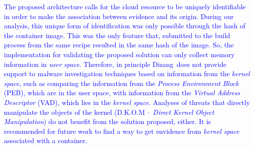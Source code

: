 \documentclass[conference]{IEEEtran}
\newcommand{\fancyname}{Dizang}
\begin{document}
\textcolor{blue}{The proposed architecture calls for the cloud resource to be uniquely identifiable in order to make the association between evidence and its origin.
%
During our analysis, this unique form of identification was only possible through the hash of the container image. 
%
This was the only feature that, submitted to the build process from the same recipe resulted in the same hash of the image.
%
So, the implementation for validating the proposed solution can only collect memory information in \textit{user space}.
%
Therefore, in principle \fancyname\ does not provide support to malware investigation techniques based on information from the \textit{kernel space}, such as comparing the information from the \textit{Process Environment Block} (PEB), which are in the user space, with information from the \textit{Virtual Address Descriptor} (VAD), which lies in the \textit{kernel space}. 
%
Analyses of threats that directly manipulate the objects of the kernel (D.K.O.M – \textit{Direct Kernel Object Manipulation}) do not benefit from the solution proposed, either.
%
It is recommended for future work to find a way to get envidence from \textit{kernel space} associated with a container. }


%








\end{document}
